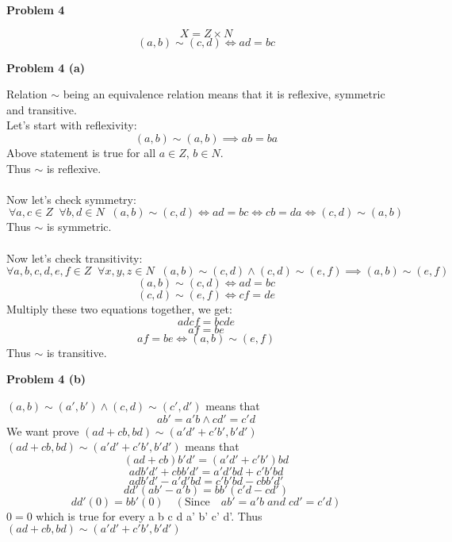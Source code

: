 \documentclass{article}
\begin{document}
\begin{flushleft}
   \textbf{\Large Problem 4}
\end{flushleft}

\[X = Z \times N\]
\[
   (a, b) \sim (c, d) \iff ad = bc
\]

\begin{flushleft}
   \textbf{\large Problem 4 (a)}
\end{flushleft}


Relation $\sim$ being an equivalence relation means that it is reflexive, symmetric and transitive. \\
Let's start with reflexivity: \\
\[
   (a, b) \sim (a, b) \implies ab = ba
\]
Above statement is true for all $a \in Z$, $b \in N$. \\
Thus $\sim$ is reflexive. \\
\\
Now let's check symmetry: \\
\[
   \forall a,c \in Z \;\; \forall b,d \in N \;\; (a, b) \sim (c, d) \iff ad = bc \iff cb = da \iff (c, d) \sim (a, b)
\]
Thus $\sim$ is symmetric. \\
\\
Now let's check transitivity: \\
\[
   \forall a,b,c,d,e,f \in Z \;\; \forall x,y,z \in N \;\; (a, b) \sim (c, d) \land (c, d) \sim (e, f) \implies (a, b) \sim (e, f)
\]
\[
   (a, b) \sim (c, d) \iff ad = bc
\]
\[
   (c, d) \sim (e, f) \iff cf = de
\]
Multiply these two equations together, we get:
\[
   adcf = bcde
\]
\[
   af = be
\]
\[
   af = be \iff (a, b) \sim (e, f)
\]
Thus $\sim$ is transitive.


\begin{flushleft}
   \textbf{\large Problem 4 (b)}
\end{flushleft}

\((a, b) \sim (a', b') \land (c, d) \sim (c', d')\) means that
\[
   ab' = a'b \land cd' = c'd
\]
We want prove \((ad+cb,bd) \sim (a'd'+c'b',b'd')\) \\
\((ad+cb,bd) \sim (a'd'+c'b',b'd')\) means that
\[
   (ad+cb)b'd' = (a'd'+c'b')bd
\]
\[
   adb'd' + cbb'd' = a'd'bd + c'b'bd
\]
\[
   adb'd' - a'd'bd = c'b'bd - cbb'd'
\]
\[
   dd'(ab' - a'b) = bb'(c'd - cd')
\]
\[
   dd'(0) = bb'(0) \quad (\text{Since} \quad ab' = a'b \; and \; cd' = c'd)
\]
\(0 = 0\) which is true for every a b c d a' b' c' d'. Thus \((ad+cb,bd) \sim (a'd'+c'b',b'd')\)
\end{document}
